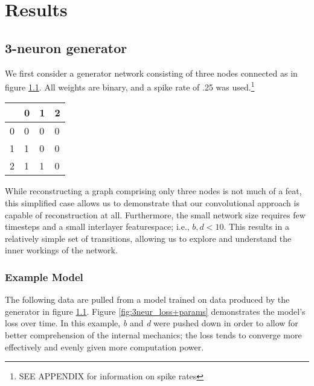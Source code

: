 \graphicspath{ {resources/models/3neurEx/} {resources/models/3neurEx/weights/} } 

\chapter{Results}
\label{results}
\section{3-neuron generator}
\label{results_3neur}
We first consider a generator network consisting of three nodes connected as in 
figure \ref{fig:2simplex+adjacency}. All weights are binary, and a spike rate of 
.25 was used.\footnote{SEE APPENDIX	for information on spike rates}

\begin{table}[h]
	\centering
	
	\hspace{2em}
	\begin{tabular}{l|lll}
		  & 0 & 1 & 2\\
		\hline
		0 & 0 & 0 & 0\\
		1 & 1 & 0 & 0\\
		2 & 1 & 1 & 0
	\end{tabular}
	\label{fig:2simplex+adjacency}
\end{table}\noindent
While reconstructing a graph comprising only three nodes is not much of a feat, 
this simplified case allows us to demonstrate that our convolutional approach is 
capable of reconstruction at all. Furthermore, the small network size requires 
few timesteps and a small interlayer featurespace; i.e., $b,d<10$. This results 
in a relatively simple set of transitions, allowing us to explore and understand 
the inner workings of the network.

\subsection{Example Model}
\label{subsec:3neurex}
The following data are pulled from a model trained on data produced by the 
generator in figure \ref{fig:2simplex+adjacency}. Figure 
\ref{fig:3neur_loss+params} demonstrates the model's loss over time. In this 
example, \textit{b} and \textit{d} were pushed down in order to allow for better 
comprehension of the internal mechanics; the loss tends to converge more 
effectively and evenly given more computation power.


